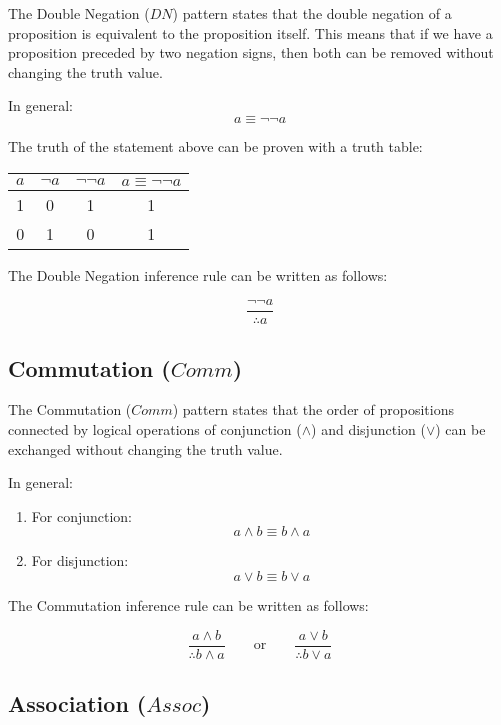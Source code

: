\documentclass[12pt,a4paper,openany]{article}
\begin{document}
The Double Negation (\(DN\)) pattern states that the double negation of a proposition is equivalent to the proposition itself. This means that if we have a proposition preceded by two negation signs, then both can be removed without changing the truth value.

In general:
\[a \equiv \lnot \lnot a\]

The truth of the statement above can be proven with a truth table:

\begin{center}
\begin{tabular}{|c|c|c|c|}
\hline
\(a\) & \(\lnot a\) & \(\lnot \lnot a\) & \(a \equiv \lnot \lnot a\) \\
\hline
1 & 0 & 1 & 1 \\
0 & 1 & 0 & 1 \\
\hline
\end{tabular}
\end{center}

The Double Negation inference rule can be written as follows:

\[
\frac{\lnot \lnot a}{\therefore a}
\]

\subsection{Commutation (\(Comm\))}\label{commutation-comm}

The Commutation (\(Comm\)) pattern states that the order of propositions connected by logical operations of conjunction (\(\land\)) and disjunction (\(\lor\)) can be exchanged without changing the truth value.

In general:

\begin{enumerate}
\item For conjunction:
  \[a \land b \equiv b \land a\]
\item For disjunction:
  \[a \lor b \equiv b \lor a\]
\end{enumerate}

The Commutation inference rule can be written as follows:

\[
\frac{a \land b}{\therefore b \land a}
\qquad \text{or} \qquad
\frac{a \lor b}{\therefore b \lor a}
\]

\subsection{Association (\(Assoc\))}\label{association-assoc}
\end{document}
